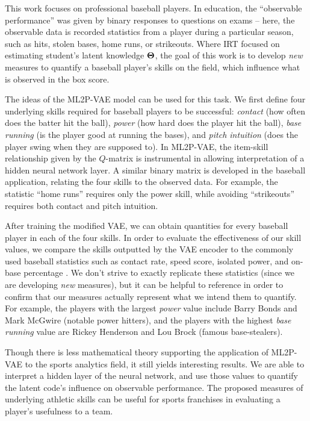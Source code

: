 This work focuses on professional baseball players. In education, the ``observable performance'' was given by binary responses to questions on exams -- here, the observable data is recorded statistics from a player during a particular season, such as hits, stolen bases, home runs, or strikeouts. Where IRT focused on estimating student's latent knowledge $\boldsymbol{\Theta}$, the goal of this work is to develop \textit{new} measures to quantify a baseball player's skills on the field, which influence what is observed in the box score.

The ideas of the ML2P-VAE model can be used for this task. We first define four underlying skills required for baseball players to be successful: \textit{contact} (how often does the batter hit the ball), \textit{power} (how hard does the player hit the ball), \textit{base running} (is the player good at running the bases), and \textit{pitch intuition} (does the player swing when they are supposed to). In ML2P-VAE, the item-skill relationship given by the $Q$-matrix is instrumental in allowing interpretation of a hidden neural network layer. A similar binary matrix is developed in the baseball application, relating the four skills to the observed data. For example, the statistic ``home runs'' requires only the power skill, while avoiding ``strikeouts'' requires both contact and pitch intuition.

After training the modified VAE, we can obtain quantities for every baseball player in each of the four skills. In order to evaluate the effectiveness of our skill values, we compare the skills outputted by the VAE encoder to the commonly used baseball statistics such as contact rate, speed score, isolated power, and on-base percentage \cite{baseball_reference}. We don't strive to exactly replicate these statistics (since we are developing \textit{new} measures), but it can be helpful to reference in order to confirm that our measures actually represent what we intend them to quantify. For example, the players with the largest \textit{power} value include Barry Bonds and Mark McGwire (notable power hitters), and the players with the highest \textit{base running} value are Rickey Henderson and Lou Brock (famous base-stealers).

Though there is less mathematical theory supporting the application of ML2P-VAE to the sports analytics field, it still yields interesting results. We are able to interpret a hidden layer of the neural network, and use those values to quantify the latent code's influence on observable performance. The proposed measures of underlying athletic skills can be useful for sports franchises in evaluating a player's usefulness to a team.

